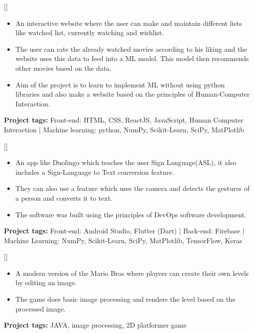 \documentclass{article}
\begin{document}

[]
\item
\begin{itemize}
\item An interactive website where the user can make and maintain different lists like watched list, currently watching and wishlist.
\item The user can rate the already watched movies according to his liking and the website uses this data to feed into a ML model. This model then recommends other movies based on the data.
\item Aim of the project is to learn to implement ML without using python libraries and also make a website based on the principles of Human-Computer Interaction.
\end{itemize}
\textbf{Project tags:} 
Front-end: HTML, CSS, ReactJS, JavaScript, Human Computer Interaction | Machine learning: python, NumPy, Scikit-Learn, SciPy, MatPlotlib 

[]
\item
\begin{itemize}
\item An app like Duolingo which teaches the user Sign Language(ASL), it also includes a Sign-Language to Text conversion feature.
\item They can also use a feature which uses the camera and detects the gestures of a person and converts it to text. 
\item The software was built using the principles of DevOps software development.
\end{itemize}
\textbf{Project tags:} 
Front-end: Android Studio, Flutter (Dart) | Back-end: Firebase | Machine Learning: NumPy, Scikit-Learn, SciPy, MatPlotlib, TensorFlow, Keras


[]
\item
\begin{itemize}
\item A modern version of the Mario Bros where players can create their own levels by editing an image.   
\item The game does basic image processing and renders the level based on the processed image.

\end{itemize}
\textbf{Project tags:} JAVA, image processing, 2D platformer game
\end{document}
